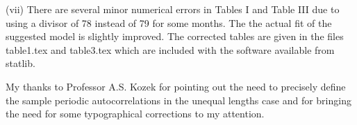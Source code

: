 \item{(vii)} There are several minor numerical errors in 
Tables I and Table III due to using a divisor of 78
instead of 79 for some months.
The the actual fit of the suggested model is slightly improved.
The corrected tables are given in the files table1.tex and table3.tex
which are included with the software available from statlib.


My thanks to Professor A.S. Kozek for pointing out the need to
precisely define the sample periodic autocorrelations in the unequal
lengths case and for bringing the need for some typographical 
corrections to my attention.

\bye
